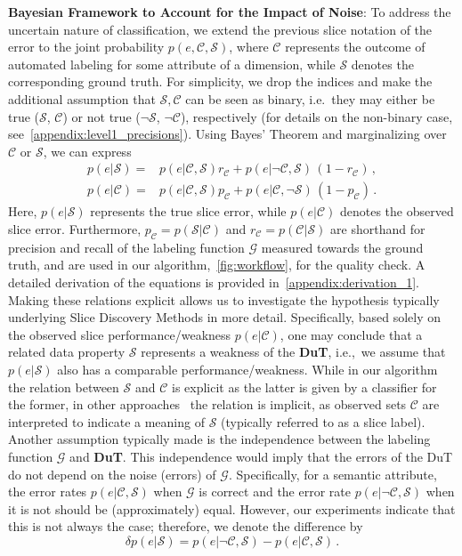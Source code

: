 \textbf{Bayesian Framework to Account for
the Impact of Noise}: To address the uncertain nature of classification, we extend the previous slice notation of the error to the joint probability $p(e,\mathcal C, \mathcal S)$, where $\mathcal C$ represents the outcome of automated labeling for some attribute of a dimension, while $\mathcal S$ denotes the corresponding ground truth. 
For simplicity, we drop the indices and make the additional assumption that $\mathcal S,\mathcal C$ can be seen as binary, i.e.\ they may either be true ($\mathcal S$, $\mathcal C$) or not true ($\neg\mathcal S$, $\neg\mathcal C$), respectively (for details on the non-binary case, see~\cref{appendix:level1_precisions}).
Using Bayes' Theorem and marginalizing over $\mathcal C$ or $\mathcal S$, we can express
\begin{align}
    p(e|\mathcal{S}) = & p(e|\mathcal C, \mathcal S)r_\mathcal C + p(e|\neg\mathcal C, \mathcal S) \,(1-r_\mathcal C)\,,
    \label{eq:pEgivenS}
    \\
    p(e|\mathcal C)=&p(e|\mathcal C,\mathcal S)p_\mathcal C+p(e|\mathcal C,\neg \mathcal S)\,(1-p_\mathcal C)\,.
    \label{eq:pEgivenC}
\end{align}
Here, $p(e|\mathcal{S})$ represents the true slice error, while $p(e|\mathcal{C})$ denotes the observed slice error. Furthermore, $p_\mathcal C = p(\mathcal S|\mathcal C)$ and $r_\mathcal C= p(\mathcal C|\mathcal S)$ are shorthand for precision and recall of the labeling function $\mathcal G$ measured towards the ground truth, and are used in our algorithm,~\cref{fig:workflow}, for the quality check.
A detailed derivation of the equations is provided in~\cref{appendix:derivation_1}.
Making these relations explicit allows us to investigate the hypothesis typically underlying Slice Discovery Methods in more detail. Specifically, based solely on the observed slice performance/weakness $p(e|\mathcal C)$, one may conclude that a related data property $\mathcal S$ represents a weakness of the \textbf{DuT}, i.e.,\ we assume that $p(e|\mathcal S)$ also has a comparable performance/weakness. While in our algorithm the relation between $\mathcal S$ and $\mathcal C$ is explicit as the latter is given by a classifier for the former, in other approaches~\citep{d2022spotlight, eyuboglu2022domino, jain2023distilling} the relation is implicit, as observed sets $\mathcal C$ are interpreted to indicate a meaning of $\mathcal S$ (typically referred to as a slice label).
Another assumption typically made is the independence between the labeling function $\mathcal G$ and \textbf{DuT}. This independence would imply that the errors of the DuT do not depend on the noise (errors) of $\mathcal G$. Specifically, for a semantic attribute, the error rates $p(e|\mathcal C, \mathcal S)$ when $\mathcal G$ is correct and the error rate $p(e|\neg\mathcal C,\mathcal S)$ when it is not should be (approximately) equal. However, our experiments indicate that this is not always the case;
therefore, we denote the difference by
\begin{equation}
    \delta p(e|\mathcal S) = p(e|\neg\mathcal C, \mathcal S)-p(e|\mathcal C, \mathcal S)\,.
\end{equation}

